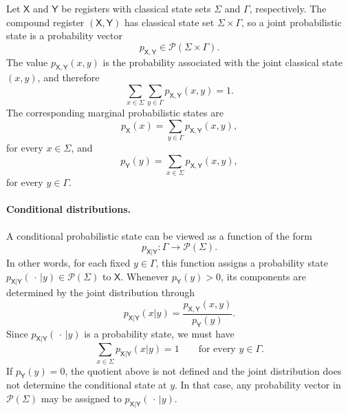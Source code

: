 \documentclass[
    aps,
    pra,
    reprint,
    superscriptaddress,
    nofootinbib
]{revtex4-2}
\theoremstyle{definition}
\theoremstyle{plain}
\begin{document}
Let $\mathsf{X}$ and $\mathsf{Y}$ be registers with classical state sets
$\Sigma$ and $\Gamma$, respectively. The compound register
$(\mathsf{X},\mathsf{Y})$ has classical state set
$\Sigma\times\Gamma$, so a joint probabilistic state is a probability vector
\begin{equation}
    p_{\mathsf{X},\mathsf{Y}}
    \in\mathcal{P}(\Sigma\times\Gamma).
\end{equation}
The value $p_{\mathsf{X},\mathsf{Y}}(x,y)$ is the probability associated
with the joint classical state $(x,y)$, and therefore
\begin{equation}
    \sum_{x\in\Sigma}\sum_{y\in\Gamma}
    p_{\mathsf{X},\mathsf{Y}}(x,y)=1.
\end{equation}
The corresponding marginal probabilistic states are
\begin{equation}
    p_{\mathsf{X}}(x)
    =
    \sum_{y\in\Gamma}p_{\mathsf{X},\mathsf{Y}}(x,y),
\end{equation}
for every $x\in\Sigma$, and
\begin{equation}
    p_{\mathsf{Y}}(y)
    =
    \sum_{x\in\Sigma}p_{\mathsf{X},\mathsf{Y}}(x,y),
\end{equation}
for every $y\in\Gamma$.

\paragraph{Conditional distributions.}

A conditional probabilistic state can be viewed as a function of the form
\begin{equation}
    p_{\mathsf{X}|\mathsf{Y}}:
    \Gamma\to\mathcal{P}(\Sigma).
\end{equation}
In other words, for each fixed $y\in\Gamma$, this function assigns a
probability state
$p_{\mathsf{X}|\mathsf{Y}}(\,\cdot\,|y)\in\mathcal{P}(\Sigma)$ to
$\mathsf{X}$. Whenever $p_{\mathsf{Y}}(y)>0$, its components are
determined by the joint distribution through
\begin{equation}
    p_{\mathsf{X}|\mathsf{Y}}(x|y)
    =
    \frac{p_{\mathsf{X},\mathsf{Y}}(x,y)}
         {p_{\mathsf{Y}}(y)}.
\end{equation}
Since $p_{\mathsf{X}|\mathsf{Y}}(\,\cdot\,|y)$ is a probability state, we
must have
\begin{equation}
    \sum_{x\in\Sigma}
    p_{\mathsf{X}|\mathsf{Y}}(x|y)=1
    \qquad\text{for every }y\in\Gamma.
\end{equation}
If $p_{\mathsf{Y}}(y)=0$, the quotient above is not defined and the joint
distribution does not determine the conditional state at $y$. In that
case, any probability vector in $\mathcal{P}(\Sigma)$ may be assigned to
$p_{\mathsf{X}|\mathsf{Y}}(\,\cdot\,|y)$.
\end{document}
